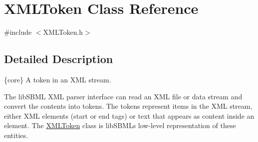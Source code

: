 \hypertarget{class_x_m_l_token}{}\section{X\+M\+L\+Token Class Reference}
\label{class_x_m_l_token}


{\ttfamily \#include $<$X\+M\+L\+Token.\+h$>$}



\subsection{Detailed Description}
\{core\} A token in an X\+ML stream.



The lib\+S\+B\+ML X\+ML parser interface can read an X\+ML file or data stream and convert the contents into tokens. The tokens represent items in the X\+ML stream, either X\+ML elements (start or end tags) or text that appears as content inside an element. The \hyperlink{class_x_m_l_token}{X\+M\+L\+Token} class is lib\+S\+B\+ML\textquotesingle{}s low-\/level representation of these entities.

